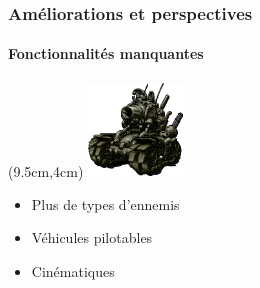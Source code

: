 \begin{frame}

\frametitle{Améliorations et perspectives}
	\framesubtitle{Fonctionnalités manquantes}


	\begin{textblock*}{2.5cm}(9.5cm,4cm)
		\includegraphics[width=2.5cm]{figures/vehicle.png}
	\end{textblock*}


	\begin{itemize}
		\item{Plus de types d'ennemis}
	\end{itemize}

	\begin{itemize}
		\item{Véhicules pilotables}
	\end{itemize}

	\begin{itemize}
		\item{Cinématiques}
	\end{itemize}

	
\end{frame}
